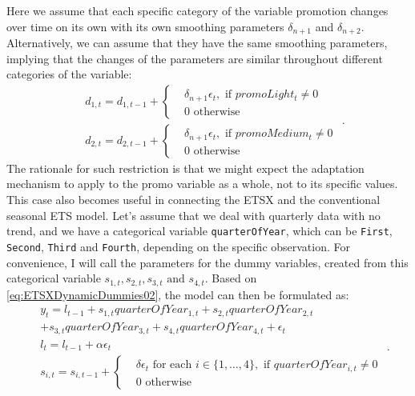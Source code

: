 \documentclass[]{book}
\theoremstyle{definition}
\theoremstyle{definition}
\theoremstyle{definition}
\theoremstyle{definition}
\theoremstyle{remark}
\begin{document}
Here we assume that each specific category of the variable promotion changes over time on its own with its own smoothing parameters \(\delta_{n+1}\) and \(\delta_{n+2}\). Alternatively, we can assume that they have the same smoothing parameters, implying that the changes of the parameters are similar throughout different categories of the variable:
\begin{equation}
  \begin{aligned}
    & d_{1,t} = d_{1,t-1} + \left \lbrace \begin{aligned}
                  &\delta_{n+1} \epsilon_t, \text{ if } promoLight_t\neq 0 \\
                  &0 \text{ otherwise }
            \end{aligned} \right. \\
    & d_{2,t} = d_{2,t-1} + \left \lbrace \begin{aligned}
                  &\delta_{n+1} \epsilon_t, \text{ if } promoMedium_t\neq 0 \\
                  &0 \text{ otherwise }
            \end{aligned} \right.
  \end{aligned} .
  \label{eq:ETSXDynamicDummies02}
\end{equation}
The rationale for such restriction is that we might expect the adaptation mechanism to apply to the promo variable as a whole, not to its specific values. This case also becomes useful in connecting the ETSX and the conventional seasonal ETS model. Let's assume that we deal with quarterly data with no trend, and we have a categorical variable \texttt{quarterOfYear}, which can be \texttt{First}, \texttt{Second}, \texttt{Third} and \texttt{Fourth}, depending on the specific observation. For convenience, I will call the parameters for the dummy variables, created from this categorical variable \(s_{1,t}, s_{2,t}, s_{3,t} \text{ and } s_{4,t}\). Based on \eqref{eq:ETSXDynamicDummies02}, the model can then be formulated as:
\begin{equation}
  \begin{aligned}
    & y_{t} = l_{t-1} + s_{1,t} quarterOfYear_{1,t} + s_{2,t} quarterOfYear_{2,t} \\
            & + s_{3,t} quarterOfYear_{3,t} + s_{4,t} quarterOfYear_{4,t} + \epsilon_t \\
    & l_t = l_{t-1} + \alpha \epsilon_t \\
    & s_{i,t} = s_{i,t-1} + \left \lbrace \begin{aligned}
                  &\delta \epsilon_t \text{ for each } i \in \{1, \dots, 4\}, \text{ if } quarterOfYear_{i,t}\neq 0 \\
                  &0 \text{ otherwise }
            \end{aligned} \right.
  \end{aligned} .
  \label{eq:ETSXDynamicDummiesSeasonal}
\end{equation}
\end{document}
